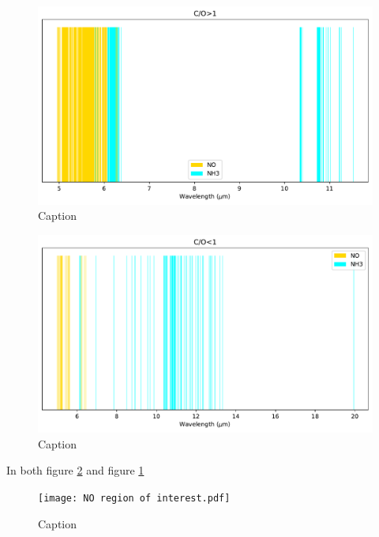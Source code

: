 \documentclass[twoside, single, authoryear, semicolon]{lion-msc}
\newcommand{\3}{$_3$}
\newcommand{\2}{$_2$}
\begin{document}
\begin{figure}[!ht]
    \centering
    \includegraphics[width=\linewidth]{Figures/ClassificationCOgt0.pdf}
    \caption{Caption}
    \label{fig:class>1}
\end{figure}

\begin{figure}[!ht]
    \centering
    \includegraphics[width=\linewidth]{Figures/ClassificationCOst0.pdf}
    \caption{Caption}
    \label{fig:class<1}
\end{figure}

In both figure \ref{fig:class<1} and figure \ref{fig:class>1}

\begin{figure}[!ht]
    \centering
    \texttt{[image: NO region of interest.pdf]}
    \caption{Caption}
    \label{fig:enter-label}
\end{figure}
\end{document}
